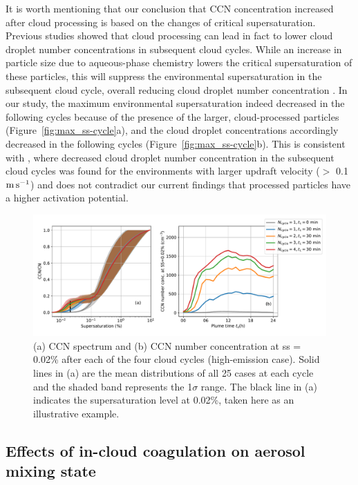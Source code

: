 \documentclass[edeposit,fullpage]{uiucthesis2009}
\begin{document}
It is worth mentioning that our conclusion that CCN concentration
increased after cloud processing is based on the changes of critical
supersaturation. Previous studies showed that cloud processing can
lead in fact to lower cloud droplet number concentrations in
subsequent cloud cycles. While an increase in particle size due to
aqueous-phase chemistry lowers the critical supersaturation of these
particles, this will suppress the environmental supersaturation in the
subsequent cloud cycle, overall reducing cloud droplet number
concentration \cite{choularton1997effect, feingold2000does,
  romakkaniemi2006influence,
  ivanova2008aerosol,bower1999modelling}. In our study, the maximum
environmental supersaturation indeed decreased in the following cycles
because of the presence of the larger, cloud-processed particles
(Figure~\ref{fig:max_ss-cycle}a), and the cloud droplet concentrations
accordingly decreased in the following cycles
(Figure~\ref{fig:max_ss-cycle}b). This is consistent with
\citet{feingold2000does}, where decreased cloud droplet number
concentration in the subsequent cloud cycles was found for the
environments with larger updraft velocity ($>$ 0.1~$\rm m \, s^{-1}$)
and does not contradict our current findings that processed particles
have a higher activation potential.


\begin{figure}
    \centering
    \includegraphics[scale=0.4]{chap3_figs/fig11.pdf}
    \caption{(a) CCN spectrum and (b) CCN number
      concentration at ss = 0.02\% after each of the four cloud
      cycles (high-emission case). Solid lines in (a) are the
      mean distributions of all 25 cases at each cycle and the shaded
      band represents the 1$\sigma$ range. The black line in (a)
      indicates the supersaturation level at 0.02\%, taken here
        as an illustrative example.}
    \label{fig:cycle_ccn}
\end{figure}

\subsection{Effects of in-cloud coagulation on aerosol mixing state} 
\label{sec:coag}
\end{document}
